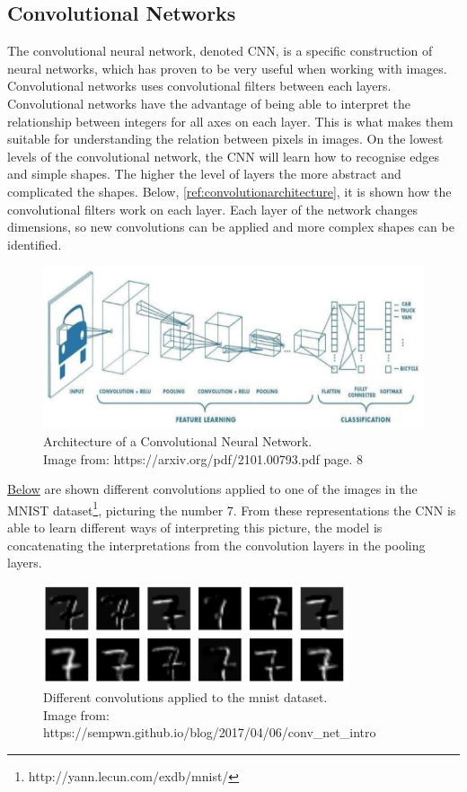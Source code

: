 \subsection{Convolutional Networks}\label{sec:Convolutional}
The convolutional neural network\autocite{dumoulin2018guide}, denoted CNN, is a specific construction of neural networks, which has proven to be very useful when working with images. Convolutional networks uses convolutional filters between each layers. Convolutional networks have the advantage of being able to interpret the relationship between integers for all axes on each layer. This is what makes them suitable for understanding the relation between pixels in images. On the lowest levels of the convolutional network, the CNN will learn how to recognise edges and simple shapes. The higher the level of layers the more abstract and complicated the shapes. Below, \autoref{ref:convolutionarchitecture}, it is shown how the convolutional filters work on each layer. Each layer of the network changes dimensions, so new convolutions can be applied and more complex shapes can be identified.
\begin{figure}[H]
    \centering
    \includegraphics[width = \textwidth]{pictures/random/convolutionarchitecture}
    \caption{Architecture of a Convolutional Neural Network.\\
    Image from: https://arxiv.org/pdf/2101.00793.pdf page. 8}
    \label{ref:convolutionarchitecture}
\end{figure}
\hyperref[ref:MNIST]{Below} are shown different convolutions applied to one of the images in the MNIST dataset\footnote{http://yann.lecun.com/exdb/mnist/}, picturing the number 7. From these representations the CNN is able to learn different ways of interpreting this picture, the model is concatenating the interpretations from the convolution layers in the pooling layers.
\begin{figure}[H]
    \centering
    \includegraphics[width = 0.8\textwidth]{pictures/random/mnist}
    \caption{Different convolutions applied to the mnist dataset.\\
    Image from: https://sempwn.github.io/blog/2017/04/06/conv\_net\_intro}
    \label{ref:MNIST}
\end{figure}
